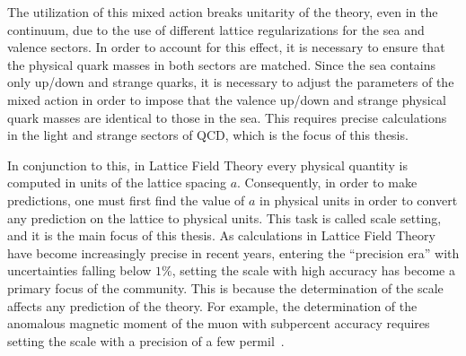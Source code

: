 The utilization of this mixed action breaks unitarity of the theory, even in the continuum, due to the use of different lattice regularizations for the sea and valence sectors. In order to account for this effect, it is necessary to ensure that the physical quark masses in both sectors are matched. Since the sea contains only up/down and strange quarks, it is necessary to adjust the parameters of the mixed action in order to impose that the valence up/down and strange physical quark masses are identical to those in the sea. This requires precise calculations in the light and strange sectors of QCD, which is the focus of this thesis.

In conjunction to this, in Lattice Field Theory every physical quantity is computed in units of the lattice spacing $a$. Consequently, in order to make predictions, one must first find the value of $a$ in physical units in order to convert any prediction on the lattice to physical units. This task is called scale setting, and it is the main focus of this thesis. As calculations in Lattice Field Theory have become increasingly precise in recent years, entering the ``precision era'' with uncertainties falling below $1\%$, setting the scale with high accuracy has become a primary focus of the community. This is because the determination of the scale affects any prediction of the theory. For example, the determination of the anomalous magnetic moment of the muon with subpercent accuracy requires setting the scale with a precision of a few permil~\citep{Borsanyi:2020mff}.

